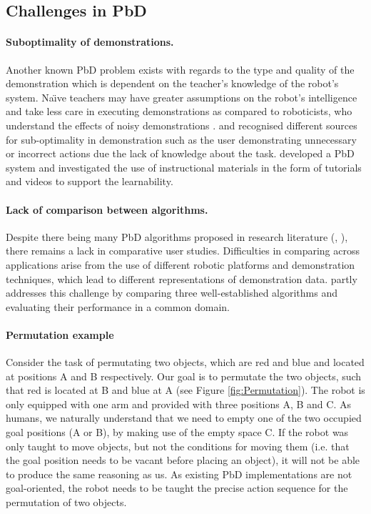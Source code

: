 \subsection{Challenges in PbD}\label{sssec:Challenges in PbD}

\paragraph{Suboptimality of demonstrations.}
Another known PbD problem exists with regards to the type and quality of the demonstration which is dependent on the teacher's knowledge of the robot's system.
Na\"{\i}ve teachers may have greater assumptions on the robot's intelligence and take less care in executing demonstrations as compared to roboticists, who understand the effects of noisy demonstrations \cite{suay2012practical}.
\cite{chen2003programing} and \cite{kaiser1995obtaining} recognised different sources for sub-optimality in demonstration such as the user demonstrating unnecessary or incorrect actions due the lack of knowledge about the task.
\cite{cakmak2014teaching} developed a PbD system and investigated the use of instructional materials in the form of tutorials and videos to support the learnability.

\paragraph{Lack of comparison between algorithms.}
Despite there being many PbD algorithms proposed in research literature (\cite{argall2009survey}, \cite{billing2010formalism}), there remains a lack in comparative user studies.
Difficulties in comparing across applications arise from the use of different robotic platforms and demonstration techniques, which lead to different representations of demonstration data.
\cite{suay2012practical} partly addresses this challenge by comparing three well-established algorithms and evaluating their performance in a common domain.


\paragraph{Permutation example}
Consider the task of permutating two objects, which are red and blue and located at positions A and B respectively.
Our goal is to permutate the two objects, such that red is located at B and blue at A (see Figure \ref{fig:Permutation}).
The robot is only equipped with one arm and provided with three positions A, B and C.
As humans, we naturally understand that we need to empty one of the two occupied goal positions (A or B), by making use of the empty space C.
If the robot was only taught to move objects, but not the conditions for moving them (i.e.
 that the goal position needs to be vacant before placing an object), it will not be able to produce the same reasoning as us.
As existing PbD implementations are not goal-oriented, the robot needs to be taught the precise action sequence for the permutation of two objects.

